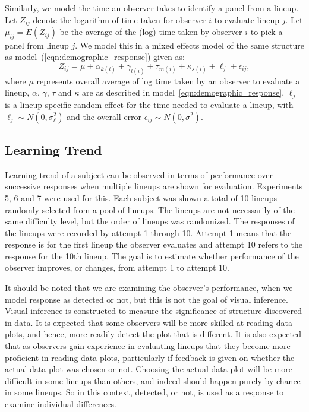 \documentclass[10pt]{article}\usepackage[]{graphicx}\usepackage[]{xcolor}
\newcommand{\hh}[1]{{\color{magenta} #1}}
\begin{document}
Similarly, we model the  time  an observer takes to identify a panel from a lineup. Let $Z_{ij}$ denote the logarithm of time taken for  observer $i$ to evaluate  lineup $j$. Let $\mu_{ij}=  E(Z_{ij})$ be the average of the (log) time taken by  observer $i$ to pick a panel from lineup $j$. We model this in a mixed effects model of the same structure as model~(\ref{eqn:demographic_response}) given as:
\begin{equation} \label{eqn:demographic_time}
Z_{ij} = \mu + \alpha_{k(i)} + \gamma_{l(i)} + \tau_{m(i)}+ \kappa_{s(i)} + \ell_j+ \epsilon_{ij},  
\end{equation}
where $\mu$ represents overall average of log time taken by an observer to evaluate a lineup, $\alpha$, $\gamma$, $\tau$ and  $\kappa$ are as described in model~\eqref{eqn:demographic_response}, $\ell_j$ is a lineup-specific random effect for the time needed to evaluate a lineup, with $\ell_j \sim N(0, \sigma_\ell^2)$ and the overall error $\epsilon_{ij} \sim N(0, \sigma^2)$.  

\subsection{Learning Trend} Learning trend of a subject can be observed in terms of performance over successive responses when multiple lineups are shown for evaluation. Experiments 5, 6 and 7 were used for this. Each subject was shown a total of 10 lineups randomly selected from a pool of lineups. The lineups are not necessarily of the same difficulty level, but the order of lineups was randomized. The responses of the lineups were recorded by attempt 1 through 10. Attempt 1 means that the response is for the first lineup the observer evaluates and attempt 10 refers to the response for the 10th lineup. The goal is to estimate whether performance of the observer improves, or changes, from attempt 1 to attempt 10. 

It should be noted that we are examining the observer's performance, when we model response as detected or not, but this is not the goal of visual inference. Visual inference is constructed to measure the significance of structure discovered in data. It is expected that some observers will be more skilled at reading data plots, and hence, more readily detect the plot that is different. It is also expected that as observers gain experience in evaluating lineups that they become more proficient in reading data plots, particularly if feedback is given on whether the actual data plot was chosen or not. Choosing the actual data plot will be more difficult in some lineups than others, and indeed should happen purely by chance in some lineups. So in this context, detected, or not, is used as a response to examine individual differences. 
\end{document}
